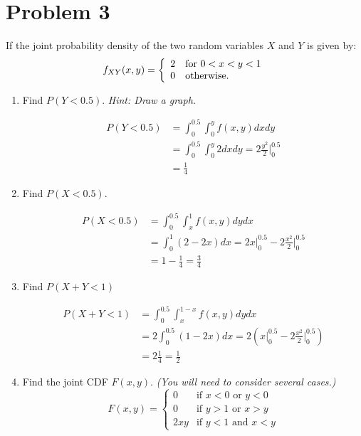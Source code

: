 \documentclass{article}
\newcommand{\1}{\mathbf{1}}
\begin{document}
\newpage
\section*{Problem 3} 
If the joint probability density of the two random variables $X$ and $Y$ is given by:
$$ f_{XY}(x,y) =\left\{
    \begin{array}{ll}
        2 & \hbox{for } 0 < x < y <1 \\
        0 & \hbox{otherwise.}
    \end{array}
\right.$$

\begin{enumerate}
    \item Find $P(Y<0.5)$. {\it Hint: Draw a graph.}  

    \begin{align*}
        P(Y<0.5) &= \int_0^{0.5} \int_0^y f(x,y)dxdy \\
        &= \int_0^{0.5} \int_0^y 2 dxdy = 2 \frac{y^2}{2}\bigg |_0^{0.5} \\
        &= \frac{1}{4}
    \end{align*}


    \item Find $P(X<0.5)$. 
    
    \begin{align*}
        P(X<0.5) &= \int_0^{0.5}\int_x^1 f(x,y)dydx \\
        &= \int_0^1 (2-2x) dx = 2x|_0^{0.5} -  2\frac{x^2}{2}\bigg |_0^{0.5} \\
        &= 1 - \frac{1}{4} = \frac{3}{4}
    \end{align*}
    
    
    \item Find $P(X+Y < 1)$ 
    
    \begin{align*}
        P(X+Y<1) &= \int_0^{0.5}\int_x^{1-x} f(x,y)dydx \\
        &= 2\int_0^{0.5} (1-2x) dx = 2\left(x|_0^{0.5} -  2\frac{x^2}{2}\bigg |_0^{0.5}\right) \\
        &= 2\frac{1}{4} = \frac{1}{2}
    \end{align*}
        
    
    \item Find the joint CDF $F(x,y)$. {\it (You will need to consider several cases.)}  
    $$F(x,y) = \begin{cases} 
	        0   &\mbox{if } x < 0 \mbox{ or } y<0   \\
	        0   &\mbox{if } y > 1 \mbox{ or } x > y \\
            2xy &\mbox{if } y < 1 \mbox{ and } x<y
        \end{cases}  
    $$
\end{enumerate}
\end{document}
